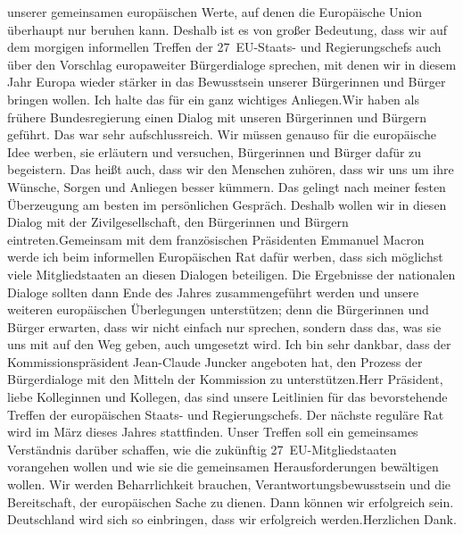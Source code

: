 \documentclass{article}
\begin{document}
unserer gemeinsamen europäischen Werte, auf denen die Europäische Union überhaupt nur beruhen kann. Deshalb ist es von großer Bedeutung, dass wir auf dem morgigen informellen Treffen der 27 EU-Staats- und Regierungschefs auch über den Vorschlag europaweiter Bürgerdialoge sprechen, mit denen wir in diesem Jahr Europa wieder stärker in das Bewusstsein unserer Bürgerinnen und Bürger bringen wollen. Ich halte das für ein ganz wichtiges Anliegen.Wir haben als frühere Bundesregierung einen Dialog mit unseren Bürgerinnen und Bürgern geführt. Das war sehr aufschlussreich. Wir müssen genauso für die europäische Idee werben, sie erläutern und versuchen, Bürgerinnen und Bürger dafür zu begeistern. Das heißt auch, dass wir den Menschen zuhören, dass wir uns um ihre Wünsche, Sorgen und Anliegen besser kümmern. Das gelingt nach meiner festen Überzeugung am besten im persönlichen Gespräch. Deshalb wollen wir in diesen Dialog mit der Zivilgesellschaft, den Bürgerinnen und Bürgern eintreten.Gemeinsam mit dem französischen Präsidenten Emmanuel Macron werde ich beim informellen Europäischen Rat dafür werben, dass sich möglichst viele Mitgliedstaaten an diesen Dialogen beteiligen. Die Ergebnisse der nationalen Dialoge sollten dann Ende des Jahres zusammengeführt werden und unsere weiteren europäischen Überlegungen unterstützen; denn die Bürgerinnen und Bürger erwarten, dass wir nicht einfach nur sprechen, sondern dass das, was sie uns mit auf den Weg geben, auch umgesetzt wird. Ich bin sehr dankbar, dass der Kommissionspräsident Jean-Claude Juncker angeboten hat, den Prozess der Bürgerdialoge mit den Mitteln der Kommission zu unterstützen.Herr Präsident, liebe Kolleginnen und Kollegen, das sind unsere Leitlinien für das bevorstehende Treffen der europäischen Staats- und Regierungschefs. Der nächste reguläre Rat wird im März dieses Jahres stattfinden. Unser Treffen soll ein gemeinsames Verständnis darüber schaffen, wie die zukünftig 27 EU-Mitgliedstaaten vorangehen wollen und wie sie die gemeinsamen Herausforderungen bewältigen wollen. Wir werden Beharrlichkeit brauchen, Verantwortungsbewusstsein und die Bereitschaft, der europäischen Sache zu dienen. Dann können wir erfolgreich sein. Deutschland wird sich so einbringen, dass wir erfolgreich werden.Herzlichen Dank.
\end{document}
